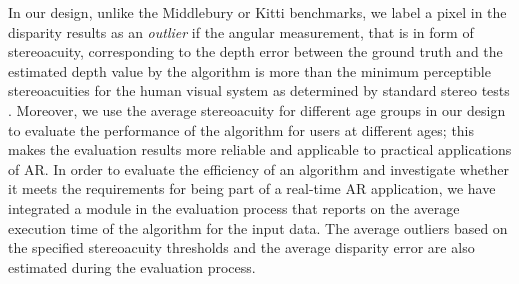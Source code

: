 

In our design, unlike the Middlebury or Kitti benchmarks, we label a pixel in the disparity results as an \textit{outlier} if the angular
measurement, that is in form of stereoacuity, corresponding to the depth error between the ground truth and the estimated depth value by the 
algorithm is more than the minimum perceptible stereoacuities
for the human visual system as determined
by standard stereo tests \cite{binr83,garn06}. 
Moreover, we use the average stereoacuity for different age groups \cite{garn06} in our design to evaluate the performance of the algorithm for users 
at different ages; this makes the evaluation results more reliable and applicable to practical applications of AR.
In order to evaluate the efficiency of an algorithm and investigate whether it meets the requirements for being part of a real-time AR application, 
we have integrated a module in the evaluation process that reports on the average execution time of the algorithm for the input data.
The average outliers based on the specified stereoacuity thresholds and the average disparity error are also estimated during the evaluation process.


